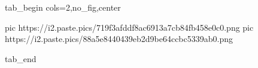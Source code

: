  
 
 
 
 


\ifcmt
  tab_begin cols=2,no_fig,center

     pic https://i2.paste.pics/719f3afddf8ac6913a7cb84fb458e0c0.png
		 pic https://i2.paste.pics/88a5e8440439eb2d9be64ccbc5339ab0.png

  tab_end
\fi
